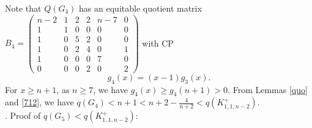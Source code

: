 \documentclass[12pt]{article}
\begin{document}
\begin{appendices}
Note that $Q(G_4)$ has an equitable quotient matrix
$B_4=
\left(\begin{smallmatrix}
n-2 &  1  & 2 & 2 & n-7 & 0 \\
1   &  1  & 0 & 0 & 0   & 0 \\
1   &  0  & 5 & 2 & 0   & 0 \\
1   &  0  & 2 & 4 & 0   & 1 \\
1   &  0  & 0 & 0 & 7   & 0 \\
0   &  0  & 0 & 2 & 0   & 2
\end{smallmatrix}\right)$
with CP
\[
g_4(x)=(x-1)g_3(x).
\]
For $x\ge n+1$, as $n\ge 7$, we have $g_4(x)\ge g_4(n+1)>0$.
From Lemmas \ref{quo} and \ref{712}, we have $q(G_4)<n+1<n+2-\frac{4}{n+2}<q(K_{1,1,n-2}^+)$.\\

. Proof of $q(G_5)<q(K_{1,1,n-2}^+)$:


\end{appendices}
\end{document}
